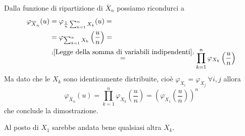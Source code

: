 \Soluzione{} %
Dalla funzione di ripartizione di $\overline{X}_n$ possiamo ricondurci a
\begin{gather*}
\begin{aligned}
\varphi_{\overline{X}_n}(u)&=\varphi_{\frac{1}{n}\sum_{k=1}^n X_k}(u)=\\
&=\varphi_{\sum_{k=1}^n X_k}\left(\frac{u}{n}  \right)=\\
&\overset{\underset{(\ref{Legge della somma di variabili indipendenti})}{}}{=}\prod_{k=1}^n \varphi_{X_k}\left(\frac{u}{n}  \right)
\end{aligned}
\end{gather*}
Ma dato che le $X_k$ sono identicamente distribuite, cioè $\varphi_{X_i}=\varphi_{X_j}\ \forall i,j$ allora
\[
\varphi_{\overline{X}_n}(u)=\prod_{k=1}^n \varphi_{X_k}\left(\frac{u}{n}  \right)=\left(\varphi_{X_1}\left(\frac{u}{n}\right)\right)^n
\] 
che conclude la dimostrazione.
\\
\begin{nb}
Al posto di $X_1$ sarebbe andata bene qualsiasi altra $X_k$.
\end{nb}

